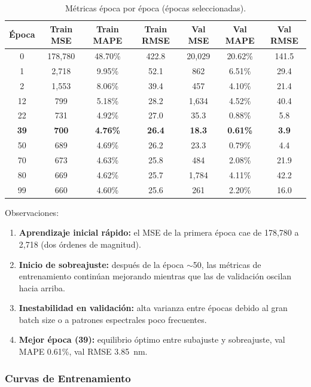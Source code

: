 \documentclass{article}
\begin{document}
\begin{table}[htbp]
\centering
\caption{Métricas época por época (épocas seleccionadas).}
\label{tab:epoch-detail}
\begin{tabular}{ccccccc}
\hline
Época & Train MSE & Train MAPE & Train RMSE & Val MSE & Val MAPE & Val RMSE \\
\hline
0  & 178,780 & 48.70\% & 422.8 & 20,029 & 20.62\% & 141.5 \\
1  & 2,718   & 9.95\%  & 52.1  & 862    & 6.51\%  & 29.4 \\
2  & 1,553   & 8.06\%  & 39.4  & 457    & 4.10\%  & 21.4 \\
12 & 799     & 5.18\%  & 28.2  & 1,634  & 4.52\%  & 40.4 \\
22 & 731     & 4.92\%  & 27.0  & 35.3   & 0.88\%  & 5.8 \\
\textbf{39} & \textbf{700} & \textbf{4.76\%} & \textbf{26.4} & \textbf{18.3} & \textbf{0.61\%} & \textbf{3.9} \\
50 & 689     & 4.69\%  & 26.2  & 23.3   & 0.79\%  & 4.4 \\
70 & 673     & 4.63\%  & 25.8  & 484    & 2.08\%  & 21.9 \\
80 & 669     & 4.62\%  & 25.7  & 1,784  & 4.11\%  & 42.2 \\
99 & 660     & 4.60\%  & 25.6  & 261    & 2.20\%  & 16.0 \\
\hline
\end{tabular}
\end{table}

Observaciones:
\begin{enumerate}
\item \textbf{Aprendizaje inicial rápido:} el MSE de la primera época cae de 178,780 a 2,718 (dos órdenes de magnitud).
\item \textbf{Inicio de sobreajuste:} después de la época $\sim$50, las métricas de entrenamiento continúan mejorando mientras que las de validación oscilan hacia arriba.
\item \textbf{Inestabilidad en validación:} alta varianza entre épocas debido al gran batch size o a patrones espectrales poco frecuentes.
\item \textbf{Mejor época (39):} equilibrio óptimo entre subajuste y sobreajuste, val MAPE 0.61\%, val RMSE 3.85~nm.
\end{enumerate}

\subsubsection{Curvas de Entrenamiento}
\end{document}
